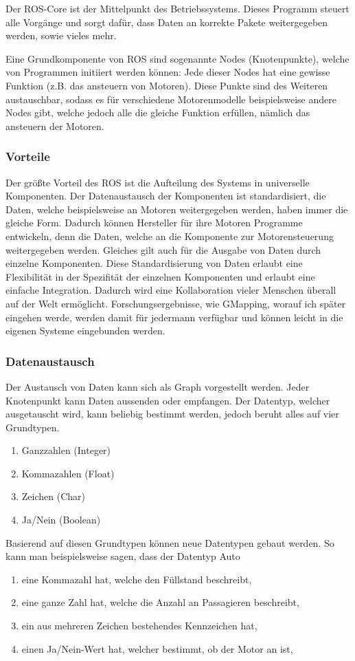 {{{			Der ROS-Core ist der Mittelpunkt des Betriebssystems. Dieses Programm steuert alle Vorgänge und sorgt dafür, dass Daten an korrekte Pakete weitergegeben werden, sowie vieles mehr. 
			
			Eine Grundkomponente von ROS sind sogenannte Nodes (Knotenpunkte), welche von Programmen initiiert werden können: Jede dieser Nodes hat eine gewisse Funktion (z.B. das ansteuern von Motoren). Diese Punkte sind des Weiteren austauschbar, sodass es für verschiedene Motorenmodelle beispielsweise andere Nodes gibt, welche jedoch alle die gleiche Funktion erfüllen, nämlich das ansteuern der Motoren.
		}
	
		\subsubsection{Vorteile}
		{
			Der größte Vorteil des ROS ist die Aufteilung des Systems in universelle Komponenten. Der Datenaustausch der Komponenten ist standardisiert, \dahe die Daten, welche beispielsweise an Motoren weitergegeben werden, haben immer die gleiche Form. Dadurch können Hersteller für ihre Motoren Programme entwickeln, denn die Daten, welche an die Komponente zur Motorensteuerung weitergegeben werden. Gleiches gilt auch für die Ausgabe von Daten durch einzelne Komponenten. Diese Standardisierung von Daten erlaubt eine Flexibilität in der Spezifität der einzelnen Komponenten und erlaubt eine einfache Integration. Dadurch wird eine Kollaboration vieler Menschen überall auf der Welt ermöglicht. Forschungsergebnisse, wie \zb GMapping, worauf ich später eingehen werde, werden damit für jedermann verfügbar und können leicht in die eigenen Systeme eingebunden werden.
		}
		
		\subsubsection{Datenaustausch}
		{
			Der Austausch von Daten kann sich als Graph vorgestellt werden. Jeder Knotenpunkt kann Daten aussenden oder empfangen. Der Datentyp, welcher ausgetauscht wird, kann beliebig bestimmt werden, jedoch beruht alles auf vier Grundtypen.
			\begin{enumerate}
				\item Ganzzahlen (Integer)
				\item Kommazahlen (Float)
				\item Zeichen (Char)
				\item Ja/Nein (Boolean)
			\end{enumerate}
			Basierend auf diesen Grundtypen können neue Datentypen gebaut werden. So kann man beispielsweise sagen, dass der Datentyp Auto
			\begin{enumerate}
				\item eine Kommazahl hat, welche den Füllstand beschreibt,
				\item eine ganze Zahl hat, welche die Anzahl an Passagieren beschreibt,
				\item ein aus mehreren Zeichen bestehendes Kennzeichen hat,
				\item einen Ja/Nein-Wert hat, welcher bestimmt, ob der Motor an ist,
			\end{enumerate}
			
}}}
